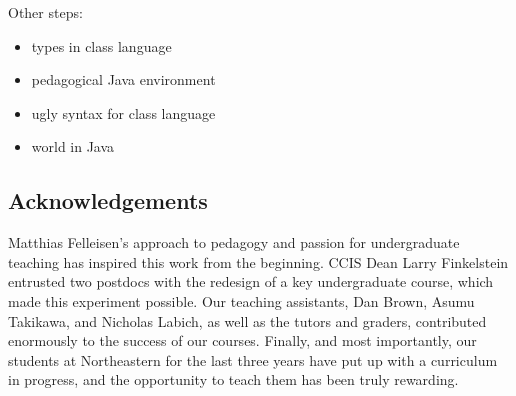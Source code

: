 \documentclass[submission,copyright]{eptcs}
\begin{document}
Other steps:
\begin{itemize}
\item types in class language
\item pedagogical Java environment
\item ugly syntax for class language
\item world in Java
\end{itemize}

\cite{dvanhorn:sicp}

\cite{local:htdc}

\subsection*{Acknowledgements}

Matthias Felleisen's approach to pedagogy and passion for
undergraduate teaching has inspired this work from the beginning.
CCIS Dean Larry Finkelstein entrusted two postdocs with the redesign
of a key undergraduate course, which made this experiment possible.
Our teaching assistants, Dan Brown, Asumu Takikawa, and Nicholas
Labich, as well as the tutors and graders, contributed enormously to
the success of our courses. Finally, and most importantly, our
students at Northeastern for the last three years have put up with a
curriculum in progress, and the opportunity to teach them has been
truly rewarding.



\end{document}
